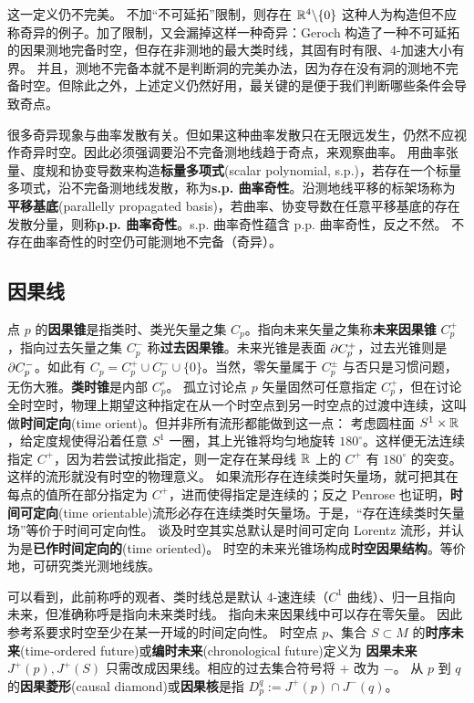 这一定义仍不完美。
不加“不可延拓”限制，则存在 $\mathbb{R}^4\backslash\{0\}$ 这种人为构造但不应称奇异的例子。加了限制，又会漏掉这样一种奇异：Geroch 构造了一种不可延拓的因果测地完备时空，但存在非测地的最大类时线，其固有时有限、4-加速大小有界。
并且，测地不完备本就不是判断洞的完美办法，因为存在没有洞的测地不完备时空。但除此之外，上述定义仍然好用，最关键的是便于我们判断哪些条件会导致奇点。

很多奇异现象与曲率发散有关。但如果这种曲率发散只在无限远发生，仍然不应视作奇异时空。因此必须强调要沿不完备测地线趋于奇点，来观察曲率。
用曲率张量、度规和协变导数来构造\textbf{标量多项式}(scalar polynomial, s.p.)，若存在一个标量多项式，沿不完备测地线发散，称为\textbf{s.p. 曲率奇性}。沿测地线平移的标架场称为\textbf{平移基底}(parallelly propagated basis)，若曲率、协变导数在任意平移基底的存在发散分量，则称\textbf{p.p. 曲率奇性}。s.p. 曲率奇性蕴含 p.p. 曲率奇性，反之不然。
不存在曲率奇性的时空仍可能测地不完备（奇异）。

\subsection{因果线}

点 $p$ 的\textbf{因果锥}是指类时、类光矢量之集 $C_p$。指向未来矢量之集称\textbf{未来因果锥} $C_p^+$，指向过去矢量之集 $C_p^-$ 称\textbf{过去因果锥}。未来光锥是表面 $\partial C_p^+$，过去光锥则是 $\partial C_p^-$。如此有 $C_p=C_p^+\cup C_p^-\cup\{0\}$。当然，零矢量属于 $C_p^\pm$ 与否只是习惯问题，无伤大雅。\textbf{类时锥}是内部 $C_p^\circ$。
孤立讨论点 $p$ 矢量固然可任意指定 $C_p^+$，但在讨论全时空时，物理上期望这种指定在从一个时空点到另一时空点的过渡中连续，这叫做\textbf{时间定向}(time orient)。但并非所有流形都能做到这一点：
考虑圆柱面 $S^1\times\mathbb{R}$，给定度规使得沿着任意 $S^1$ 一圈，其上光锥将均匀地旋转 $180^\circ$。这样便无法连续指定 $C^+$，因为若尝试按此指定，则一定存在某母线 $\mathbb{R}$ 上的 $C^+$ 有 $180^\circ$ 的突变。
这样的流形就没有时空的物理意义。
如果流形存在连续类时矢量场，就可把其在每点的值所在部分指定为 $C^+$，进而使得指定是连续的；反之 Penrose 也证明，\textbf{时间可定向}(time orientable)流形必存在连续类时矢量场。于是，“存在连续类时矢量场”等价于时间可定向性。
谈及时空其实总默认是时间可定向 Lorentz 流形，并认为是\textbf{已作时间定向的}(time oriented)。
时空的未来光锥场构成\textbf{时空因果结构}。等价地，可研究类光测地线族。

可以看到，此前称呼的观者、类时线总是默认 4-速连续（$C^1$ 曲线）、归一且指向未来，但准确称呼是指向未来类时线。
指向未来因果线中可以存在零矢量。
因此参考系要求时空至少在某一开域的时间定向性。
时空点 $p$、集合 $S\subset M$ 的\textbf{时序未来}(time-ordered future)或\textbf{编时未来}(chronological future)定义为
\textbf{因果未来} $J^+(p),J^+(S)$ 只需改成因果线。相应的过去集合符号将 $+$ 改为 $-$。
从 $p$ 到 $q$ 的\textbf{因果菱形}(causal diamond)或\textbf{因果核}是指 $D_p^q:=J^+(p)\cap J^-(q)$。

